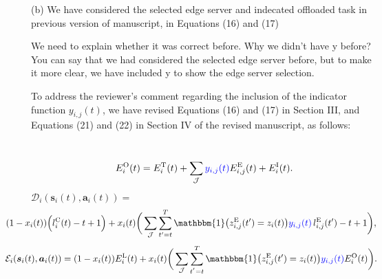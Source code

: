 \documentclass[12pt,draftclsnofoot,onecolumn]{IEEEtran}
\newcommand{\rev}[1]{{\color{blue}#1}} %
\newcommand{\rev}[1]{#1}
\newenvironment{my}[2]%
{\begin{list}{}%
{\setlength{\rightmargin}{#1}\setlength{\leftmargin}{#2}}%


 \item[]{}

} {\end{list}}
\begin{document}
\begin{enumerate}
\begin{my}{1cm}{1cm}
{{}}
\end{my} \vspace{5mm}

\setcounter{equation}{15}

(b) We have considered the selected edge server and indecated offloaded task in previous version of manuscript, in Equations (16) and (17) 

We need to explain whether it was correct before. Why we didn't have y before? You can say that we had considered the selected edge server before, but to make it more clear, we have included y to show the edge server selection.

To address the reviewer’s comment regarding the inclusion of the indicator function $y_{i,j}(t)$, we have revised Equations (16) and (17) in Section III, and Equations (21) and (22) in Section IV of the revised manuscript, as follows:
\setcounter{equation}{16}
		\begin{my}{1cm}{1cm}
	\rev{
		{\ \color{black}
\begin{alignat}{1}
	E_i^{\text{O}}(t) = E_i^{\text{T}}(t) + \sum_{\mathcal{J}} \textcolor{blue}{y_{i,j}(t)} E_{i,j}^{\text{E}}(t) + E_i^{\text{I}}(t).
	\label{17}
\end{alignat}
\setcounter{equation}{20}
	\hspace{-10mm}$\mathcal{D}_i(\boldsymbol{s}_i(t),\boldsymbol{a}_i(t)) =$
\begin{alignat}{1}
 \hspace{-10mm}(1-x_i(t))\Big(l_i^{\text{C}}(t) - t + 1\Big)  +  x_i(t)\bigg( \sum\limits_{\mathcal{J}} \sum\limits_{t'=t}^{T} \mathbbm{1}\big(z_{i,j}^{\text{E}}(t') = z_i(t)\big) \textcolor{blue}{y_{i,j}(t)} \, l_{i,j}^{\text{E}}(t') - t +1\bigg),
	\label{21}  
\end{alignat} 
\begin{alignat}{1}
	\hspace{-10mm}\mathcal{E}_i(\boldsymbol{s}_i(t),\boldsymbol{a}_i(t)) = (1-x_i(t)) E_i^{\text{L}}(t)+  x_i(t)\bigg( \sum\limits_{\mathcal{J}} \sum\limits_{t^{'}=t}^{T}\mathbbm{1}\big(z_{i,j}^{\text{E}}(t') = z_i(t)\big) \textcolor{blue}{y_{i,j}(t)}  E_i^{\text{O}}(t)  \bigg).
	\label{22}  
\end{alignat}
}}
\end{my}





\end{enumerate}
\end{document}
